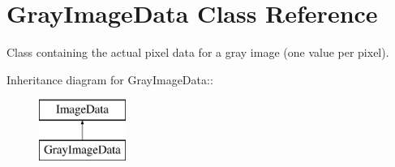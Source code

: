 \section{Gray\-Image\-Data Class Reference}
\label{class_c_s_image_viewer_1_1_gray_image_data}
Class containing the actual pixel data for a gray image (one value per pixel).  


Inheritance diagram for Gray\-Image\-Data::\begin{figure}[H]
\begin{center}
\leavevmode
\includegraphics[height=2cm]{class_c_s_image_viewer_1_1_gray_image_data}
\end{center}
\end{figure}
